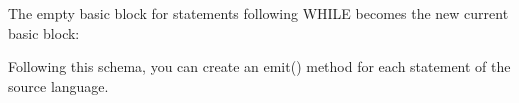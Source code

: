 The empty basic block for statements following WHILE becomes the new current basic block:

\begin{cpp}
    setCurr(AfterWhileBB);
}
\end{cpp}

Following this schema, you can create an emit() method for each statement of the source language.

































